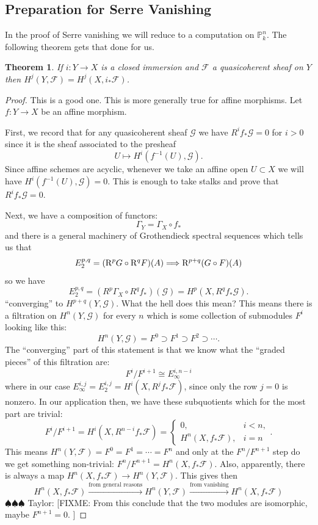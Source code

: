 \documentclass[12pt]{article}
\numberwithin{equation}{section}
\newtheorem{theorem}{Theorem}[subsection]
\theoremstyle{definition}
\theoremstyle{remark}
\newcommand{\PP}{\mathbb{P}}
\newcommand{\Fcal}{\mathcal{F}}
\newcommand{\Gcal}{\mathcal{G}}
\newcommand{\taylor}[1]{{\color{blue} \sf $\spadesuit\spadesuit\spadesuit$ Taylor: [#1]}}
\begin{document}
\subsection{Preparation for Serre Vanishing}
In the proof of Serre vanishing we will reduce to a computation on $\PP^n_k$.
The following theorem gets that done for us. 
\begin{theorem}
	If $i:Y \to X$ is a closed immersion and $\Fcal$ a quasicoherent sheaf on $Y$ then $H^j(Y,\Fcal) = H^j(X,i_*\Fcal)$.
\end{theorem}
\begin{proof}
	This is a good one. 
	This is more generally true for affine morphisms. 
	Let $f: Y \to X$ be an affine morphism. 
	
	First, we record that for any quasicoherent sheaf $\Gcal$ we have $R^if_*\Gcal=0$ for $i>0$ since it is the sheaf associated to the presheaf 
	$$ U \mapsto H^i(f^{-1}(U), \Gcal).$$
	Since affine schemes are acyclic, whenever we take an affine open $U\subset X$ we will have $H^i(f^{-1}(U),\Gcal)=0$. 
	This is enough to take stalks and prove that $R^if_*\Gcal=0$.
	
	Next, we have a composition of functors: 
	$$\Gamma_Y = \Gamma_X \circ f_*$$
	and there is a general machinery of Grothendieck spectral sequences which tells us that 
	$$ E_2^{p,q} = ({\rm R}^p G \circ{\rm R}^q F)(A) \Longrightarrow {\rm R}^{p+q} (G\circ F)(A) $$
	so we have 
	$$ E_2^{p,q} = (R^p\Gamma_X\circ R^qf_*)(\Gcal) = H^p(X,R^qf_*\Gcal). $$
	``converging'' to $H^{p+q}(Y,\Gcal)$. 
	What the hell does this mean? 
	This means there is a filtration on $H^n(Y,\Gcal)$ for every $n$ which is some collection of submodules $F^i$ looking like this:
	$$ H^n(Y,\Gcal) = F^0 \supset F^1 \supset F^2 \supset \cdots. $$
	The ``converging'' part of this statement is that we know what the ``graded pieces'' of this filtration are:
	$$ F^i/F^{i+1} \cong E_{\infty}^{i, n-i}$$
	where in our case $E_\infty^{i,j} = E_2^{i,j} = H^i(X,R^jf_*\Fcal)$, since only the row $j=0$ is nonzero.
	In our application then, we have these subquotients which for the most part are trivial:
	$$ F^i/F^{i+1} = H^i(X, R^{n-i}f_*\Fcal) = \begin{cases}
	0, & i<n,\\
	H^n(X,f_*\Fcal), & i=n
	\end{cases}.$$
	This means $H^n(Y,\Fcal)=F^0=F^1=\cdots = F^n$ and only at the $F^n/F^{n+1}$ step do we get something non-trivial: $F^n/F^{n+1} = H^n(X,f_*\Fcal)$.
	Also, apparently, there is always a map $H^n(X,f_*\Fcal) \to H^n(Y,\Fcal)$.
	This gives then 
	$$ H^n(X,f_*\Fcal) \xrightarrow{\mbox{from general reasons}} H^n(Y,\Fcal) \xrightarrow{\mbox{from vanishing}} H^n(X,f_*\Fcal) $$
	\taylor{FIXME: From this conclude that the two modules are isomorphic, maybe $F^{n+1}=0$. 
	}
\end{proof}
\end{document}
